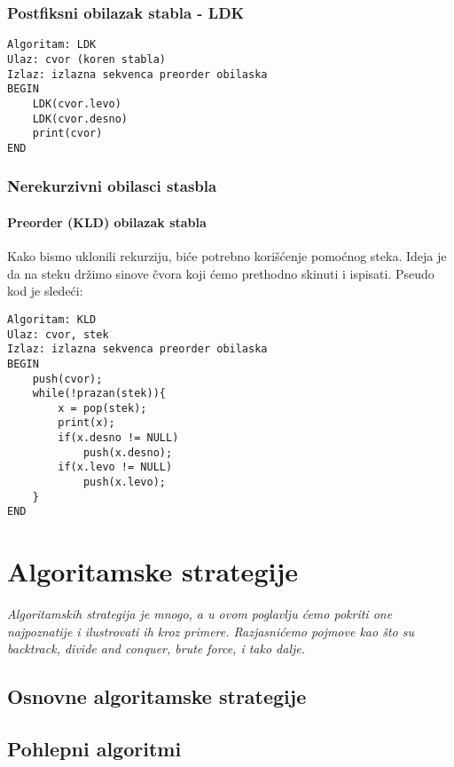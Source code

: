 \documentclass{memoir}
\begin{document}
\subsection{Postfiksni obilazak stabla - LDK}
\begin{lstlisting}
Algoritam: LDK
Ulaz: cvor (koren stabla)
Izlaz: izlazna sekvenca preorder obilaska
BEGIN
	LDK(cvor.levo)
	LDK(cvor.desno)
	print(cvor)
END
\end{lstlisting}

\subsection{Nerekurzivni obilasci stasbla}

\subsubsection{Preorder (KLD) obilazak stabla}
Kako bismo uklonili rekurziju, biće potrebno korišćenje pomoćnog steka.
Ideja je da na steku držimo sinove čvora koji ćemo prethodno skinuti i ispisati.
Pseudo kod je sledeći:
\begin{lstlisting}
Algoritam: KLD
Ulaz: cvor, stek
Izlaz: izlazna sekvenca preorder obilaska
BEGIN
	push(cvor);
	while(!prazan(stek)){
		x = pop(stek);
		print(x);
		if(x.desno != NULL)
			push(x.desno);
		if(x.levo != NULL)
			push(x.levo);
	}
END
\end{lstlisting}

\chapter{Algoritamske strategije}
\emph{Algoritamskih strategija je mnogo, a u ovom poglavlju ćemo pokriti one najpoznatije i ilustrovati ih kroz 
primere. Razjasnićemo pojmove kao što su \emph{backtrack}, \emph{divide and conquer}, \emph{brute force}, i tako dalje.}
\newpage

\section{Osnovne algoritamske strategije}

\section{Pohlepni algoritmi}
\end{document}

